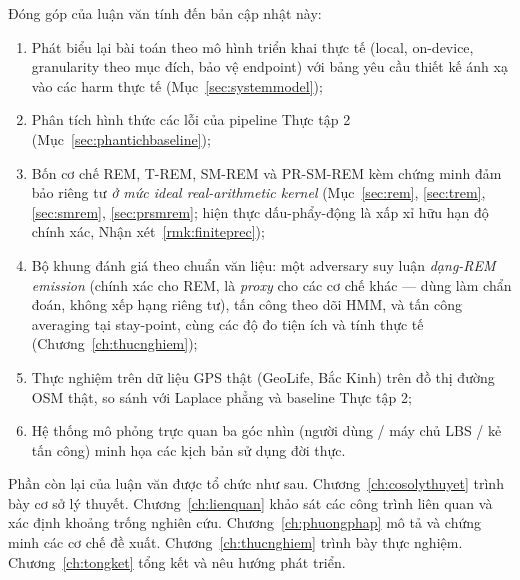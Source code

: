 Đóng góp của luận văn tính đến bản cập nhật này:
\begin{enumerate}
  \item Phát biểu lại bài toán theo mô hình triển khai thực tế (local, on-device,
  granularity theo mục đích, bảo vệ endpoint) với bảng yêu cầu thiết kế ánh xạ
  vào các harm thực tế (Mục~\ref{sec:systemmodel});
  \item Phân tích hình thức các lỗi của pipeline Thực tập 2
  (Mục~\ref{sec:phantichbaseline});
  \item Bốn cơ chế REM, T-REM, SM-REM và PR-SM-REM kèm chứng minh đảm bảo riêng
  tư \emph{ở mức ideal real-arithmetic kernel} (Mục~\ref{sec:rem}, \ref{sec:trem},
  \ref{sec:smrem}, \ref{sec:prsmrem}; hiện thực dấu-phẩy-động là xấp xỉ hữu hạn
  độ chính xác, Nhận xét~\ref{rmk:finiteprec});
  \item Bộ khung đánh giá theo chuẩn văn liệu: một adversary suy luận
  \emph{dạng-REM emission} (chính xác cho REM, là \emph{proxy} cho các cơ chế
  khác --- dùng làm chẩn đoán, không xếp hạng riêng tư), tấn công theo dõi HMM,
  và tấn công averaging tại stay-point, cùng các độ đo tiện ích và tính thực tế
  (Chương~\ref{ch:thucnghiem});
  \item Thực nghiệm trên dữ liệu GPS thật (GeoLife, Bắc Kinh) trên đồ thị đường
  OSM thật, so sánh với Laplace phẳng và baseline Thực tập 2;
  \item Hệ thống mô phỏng trực quan ba góc nhìn (người dùng / máy chủ LBS / kẻ
  tấn công) minh họa các kịch bản sử dụng đời thực.
\end{enumerate}

Phần còn lại của luận văn được tổ chức như sau. Chương~\ref{ch:cosolythuyet}
trình bày cơ sở lý thuyết. Chương~\ref{ch:lienquan} khảo sát các công trình liên
quan và xác định khoảng trống nghiên cứu. Chương~\ref{ch:phuongphap} mô tả và
chứng minh các cơ chế đề xuất. Chương~\ref{ch:thucnghiem} trình bày thực nghiệm.
Chương~\ref{ch:tongket} tổng kết và nêu hướng phát triển.
